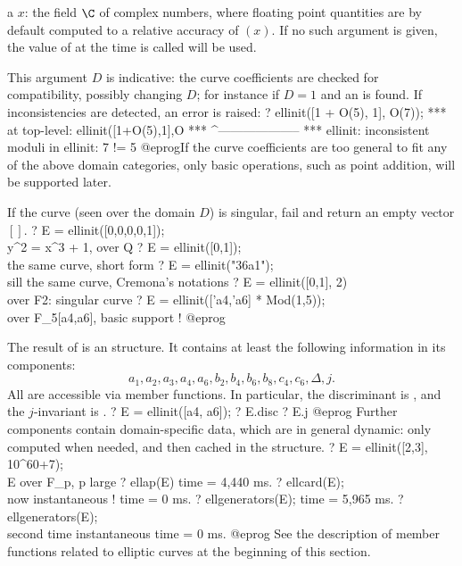 \item a  $x$: the field $\C$ of complex numbers, where floating
point quantities are by default computed to a relative accuracy of
$(x)$. If no such argument is given, the value of
 at the time  is called will be used.

This argument $D$ is indicative: the curve coefficients are checked for
compatibility, possibly changing $D$; for instance if $D = 1$ and
an  is found. If inconsistencies are detected, an error is
raised:
\bprog
? ellinit([1 + O(5), 1], O(7));
 ***   at top-level: ellinit([1+O(5),1],O
 ***                 ^--------------------
 *** ellinit: inconsistent moduli in ellinit: 7 != 5
@eprog\noindent If the curve coefficients are too general to fit any of the
above domain categories, only basic operations, such as point addition, will
be supported later.

If the curve (seen over the domain $D$) is singular, fail and return an
empty vector $[]$.
\bprog
? E = ellinit([0,0,0,0,1]); \\ y^2 = x^3 + 1, over Q
? E = ellinit([0,1]);       \\ the same curve, short form
? E = ellinit("36a1");      \\ sill the same curve, Cremona's notations
? E = ellinit([0,1], 2)     \\ over F2: singular curve
? E = ellinit(['a4,'a6] * Mod(1,5));  \\ over F_5[a4,a6], basic support !
@eprog\noindent

The result of  is an  structure. It contains at least
the following information in its components:
%
$$ a_1,a_2,a_3,a_4,a_6,b_2,b_4,b_6,b_8,c_4,c_6,\Delta,j.$$
%
All are accessible via member functions. In particular, the discriminant is
, and the $j$-invariant is .
\bprog
? E = ellinit([a4, a6]);
? E.disc
? E.j
@eprog
Further components contain domain-specific data, which are in general dynamic:
only computed when needed, and then cached in the structure.
\bprog
? E = ellinit([2,3], 10^60+7);  \\ E over F_p, p large
? ellap(E)
time = 4,440 ms.
? ellcard(E);  \\ now instantaneous !
time = 0 ms.
? ellgenerators(E);
time = 5,965 ms.
? ellgenerators(E); \\ second time instantaneous
time = 0 ms.
@eprog
See the description of member functions related to elliptic curves at the
beginning of this section.

